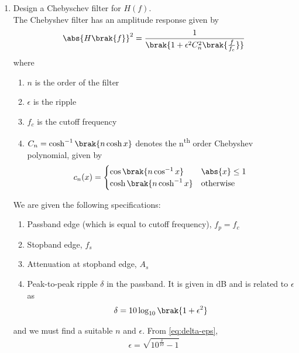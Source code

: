 \documentclass[journal,12pt,twocolumn]{IEEEtran}
\renewcommand\thesection{\arabic{section}}
\begin{document}
\begin{enumerate}[label=\thesection.\arabic*
,ref=\thesection.\theenumi]
\eqref{eq:fc2},
\begin{align}
	f_{c1} = f_p\sbrak{10^{-\frac{A_p}{10}} - 1}^{-\frac{1}{2n}} = 57.23\text{Hz} \\
	f_{c2} = f_s\sbrak{10^{-\frac{A_s}{10}} - 1}^{-\frac{1}{2n}} = 63.16\text{Hz}
\end{align}
Hence, we take $f_c = \sqrt{f_{c1}f_{c2}} = 60\text{Hz}$ approximately.
\item Design a Chebyschev filter for $H(f)$. \\
\solution
The Chebyshev filter has an amplitude response
given by
\begin{align}
	\abs{H\brak{f}}^2 = \frac{1}{\brak{1 + \epsilon^2C_n^2\brak{\frac{f}{f_c}}}}
\end{align}
where 
\begin{enumerate}
	\item $n$ is the order of the filter
	\item $\epsilon$ is the ripple
	\item $f_c$ is the cutoff frequency 
	\item $C_n = \cosh^{-1}\brak{n\cosh{x}}$ denotes 
	the n\textsuperscript{th} order Chebyshev polynomial,
	given by
	\begin{align}
		c_n(x) =
		\begin{cases}
			\cos\brak{n\cos^{-1}x} & \abs{x} \le 1 \\
			\cosh\brak{n\cosh^{-1}x} & \textrm{otherwise}
		\end{cases}
		\label{eq:chebypol}
	\end{align}
\end{enumerate}
We are given the following specifications:
\begin{enumerate}
	\item Passband edge (which is equal to 
	cutoff frequency), $f_p = f_c$
	\item Stopband edge, $f_s$
	\item Attenuation at stopband edge, $A_s$
	\item Peak-to-peak ripple $\delta$ in the passband.
	It is given in dB and is related to $\epsilon$ as
	\begin{align}
		\delta = 10\log_{10}\brak{1 + \epsilon^2}
		\label{eq:delta-eps}
	\end{align}
\end{enumerate}
and we must find a suitable $n$ and $\epsilon$. From
\eqref{eq:delta-eps},
\begin{align}
	\epsilon = \sqrt{10^{\frac{\delta}{10}} - 1}
	\label{eq:epsilon-del}

\end{align}
\end{enumerate}
\end{document}
